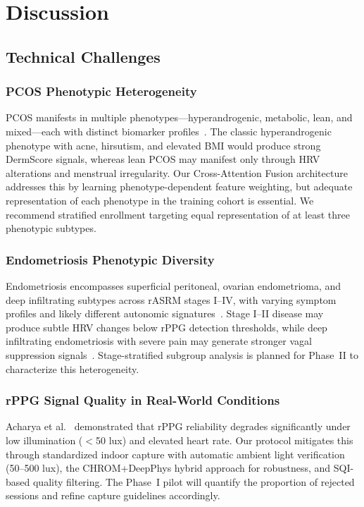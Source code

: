 \documentclass[conference]{IEEEtran}
\begin{document}
\section{Discussion}

\subsection{Technical Challenges}

\subsubsection{PCOS Phenotypic Heterogeneity}
PCOS manifests in multiple phenotypes---hyperandrogenic, metabolic, lean, and mixed---each with distinct biomarker profiles~\cite{Wang_2025, Bernal_2024}. The classic hyperandrogenic phenotype with acne, hirsutism, and elevated BMI would produce strong DermScore signals, whereas lean PCOS may manifest only through HRV alterations and menstrual irregularity. Our Cross-Attention Fusion architecture addresses this by learning phenotype-dependent feature weighting, but adequate representation of each phenotype in the training cohort is essential. We recommend stratified enrollment targeting equal representation of at least three phenotypic subtypes.

\subsubsection{Endometriosis Phenotypic Diversity}
Endometriosis encompasses superficial peritoneal, ovarian endometrioma, and deep infiltrating subtypes across rASRM stages I--IV, with varying symptom profiles and likely different autonomic signatures~\cite{Zeng_2025, Moreira_2024}. Stage I--II disease may produce subtle HRV changes below rPPG detection thresholds, while deep infiltrating endometriosis with severe pain may generate stronger vagal suppression signals~\cite{Moreira_2021}. Stage-stratified subgroup analysis is planned for Phase~II to characterize this heterogeneity.

\subsubsection{rPPG Signal Quality in Real-World Conditions}
Acharya et al.~\cite{acharya2025reliability} demonstrated that rPPG reliability degrades significantly under low illumination ($<$50 lux) and elevated heart rate. Our protocol mitigates this through standardized indoor capture with automatic ambient light verification (50--500 lux), the CHROM+DeepPhys hybrid approach for robustness, and SQI-based quality filtering. The Phase~I pilot will quantify the proportion of rejected sessions and refine capture guidelines accordingly.
\end{document}

